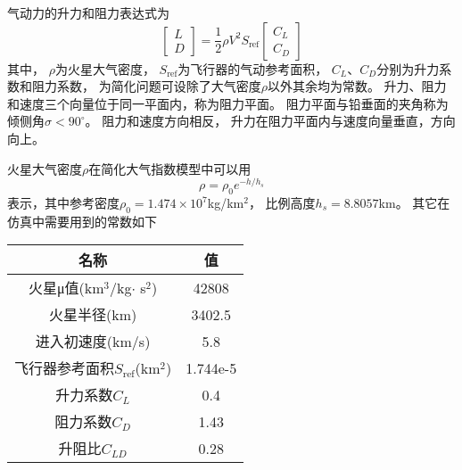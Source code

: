 气动力的升力和阻力表达式为
\begin{equation*}
    \left[\begin{matrix}
        L \\ D
    \end{matrix}\right]
    = \frac{1}{2}\rho V^2S_{\text{ref}}
    \left[\begin{matrix}
        C_L \\ C_D
    \end{matrix}\right]
\end{equation*}
其中，
$\rho$为火星大气密度，
$S_{\text{ref}}$为飞行器的气动参考面积，
$C_L$、$C_D$分别为升力系数和阻力系数，
为简化问题可设除了大气密度$\rho$以外其余均为常数。
升力、阻力和速度三个向量位于同一平面内，称为阻力平面。
阻力平面与铅垂面的夹角称为倾侧角$\sigma<90^{\circ}$。
阻力和速度方向相反，
升力在阻力平面内与速度向量垂直，方向向上。

火星大气密度$\rho$在简化大气指数模型中可以用
\[\rho=\rho_0e^{-h/h_s}\]
表示，其中参考密度$\rho_0=1.474\times10^7$kg/km$^2$，
比例高度$h_s=8.8057$km。
其它在仿真中需要用到的常数如下
\begin{tabular}{cc}
    \toprule
    名称 & 值 \\
    \midrule
    火星μ值(km$^3$/kg$\cdot$ s$^2$) & 42808 \\
    火星半径(km) & 3402.5 \\
    进入初速度(km/s) & 5.8 \\
    飞行器参考面积$S_\text{ref}$(km$^2$) & 1.744e-5 \\
    升力系数$C_L$ & 0.4 \\
    阻力系数$C_D$ & 1.43 \\
    升阻比$C_{LD}$ & 0.28 \\
    \bottomrule
\end{tabular}
